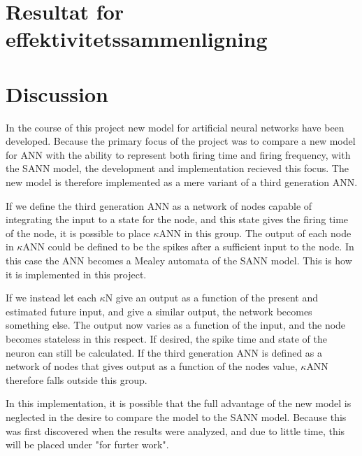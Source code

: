 

\section{Resultat for effektivitetssammenligning}



\section{Discussion}
In the course of this project new model for artificial neural networks have been developed. 
Because the primary focus of the project was to compare a new model for ANN with the ability to represent both firing time and firing frequency, with the SANN model, the development and implementation recieved this focus. 
The new model is therefore implemented as a mere variant of a third generation ANN.

If we define the third generation ANN as a network of nodes capable of integrating the input to a state for the node, and this state gives the firing time of the node, it is possible to place $\kappa$ANN in this group.
The output of each node in $\kappa$ANN could be defined to be the spikes after a sufficient input to the node.
In this case the ANN becomes a Mealey automata of the SANN model. This is how it is implemented in this project.

If we instead let each $\kappa$N give an output as a function of the present and estimated future input, and give a similar output, the network becomes something else.
The output now varies as a function of the input, and the node becomes stateless in this respect. If desired, the spike time and state of the neuron can still be calculated. 
If the third generation ANN is defined as a network of nodes that gives output as a function of the nodes value, $\kappa$ANN therefore falls outside this group.

In this implementation, it is possible that the full advantage of the new model is neglected in the desire to compare the model to the SANN model.
Because this was first discovered when the results were analyzed, and due to little time, this will be placed under "for furter work". %

